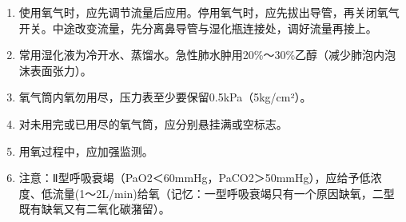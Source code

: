\documentclass[11pt, a4paper]{ctexart}
\begin{document}
\begin{enumerate}
\begin{itemize}
\begin{enumerate}
            \item 使用氧气时，应先调节流量后应用。停用氧气时，应先拔出导管，再关闭氧气开关。中途改变流量，先分离鼻导管与湿化瓶连接处，调好流量再接上。
            \item 常用湿化液为冷开水、蒸馏水。急性肺水肿用20\%～30\%乙醇（减少肺泡内泡沫表面张力）。
            \item 氧气筒内氧勿用尽，压力表至少要保留0.5kPa（5kg/cm²）。
            \item 对未用完或已用尽的氧气筒，应分别悬挂满或空标志。
            \item 用氧过程中，应加强监测。
            \item 注意：Ⅱ型呼吸衰竭（PaO2＜60mmHg，PaCO2＞50mmHg），应给予低浓度、低流量(1～2L/min)给氧（记忆：一型呼吸衰竭只有一个原因缺氧，二型既有缺氧又有二氧化碳潴留）。
        \end{enumerate}
    \end{itemize}
\end{enumerate}
\end{document}
